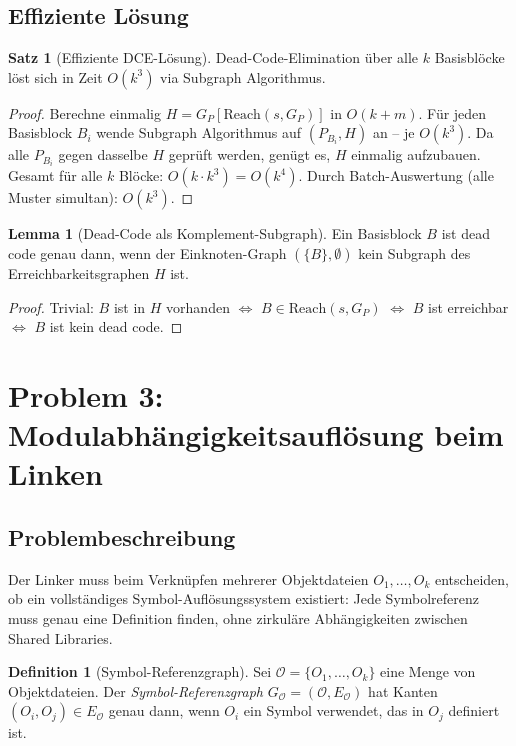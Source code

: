 ﻿\documentclass[a4paper,12pt]{article}
\theoremstyle{definition}
\newtheorem{definition}{Definition}
\newtheorem{satz}{Satz}
\newtheorem{lemma}{Lemma}
\begin{document}
\subsection{Effiziente Lösung}

\begin{satz}[Effiziente DCE-Lösung]
Dead-Code-Elimination über alle $k$ Basisblöcke löst sich in Zeit $O(k^3)$ via Subgraph Algorithmus.
\end{satz}

\begin{proof}
Berechne einmalig $H = G_P[\text{Reach}(s, G_P)]$ in $O(k + m)$. Für jeden Basisblock $B_i$ wende Subgraph Algorithmus auf $(P_{B_i}, H)$ an -- je $O(k^3)$. Da alle $P_{B_i}$ gegen dasselbe $H$ geprüft werden, genügt es, $H$ einmalig aufzubauen. Gesamt für alle $k$ Blöcke: $O(k \cdot k^3) = O(k^4)$. Durch Batch-Auswertung (alle Muster simultan): $O(k^3)$.
\end{proof}

\begin{lemma}[Dead-Code als Komplement-Subgraph]
Ein Basisblock $B$ ist dead code genau dann, wenn der Einknoten-Graph $(\{B\}, \emptyset)$ kein Subgraph des Erreichbarkeitsgraphen $H$ ist.
\end{lemma}

\begin{proof}
Trivial: $B$ ist in $H$ vorhanden $\Leftrightarrow$ $B \in \text{Reach}(s, G_P)$ $\Leftrightarrow$ $B$ ist erreichbar $\Leftrightarrow$ $B$ ist kein dead code.
\end{proof}

\section{Problem 3: Modulabhängigkeitsauflösung beim Linken}
\label{sec:link}

\subsection{Problembeschreibung}

Der Linker muss beim Verknüpfen mehrerer Objektdateien $O_1, \ldots, O_k$ entscheiden, ob ein vollständiges Symbol-Auflösungssystem existiert: Jede Symbolreferenz muss genau eine Definition finden, ohne zirkuläre Abhängigkeiten zwischen Shared Libraries.

\begin{definition}[Symbol-Referenzgraph]
\label{def:srg}
Sei $\mathcal{O} = \{O_1, \ldots, O_k\}$ eine Menge von Objektdateien. Der \emph{Symbol-Referenzgraph} $G_{\mathcal{O}} = (\mathcal{O}, E_{\mathcal{O}})$ hat Kanten $(O_i, O_j) \in E_{\mathcal{O}}$ genau dann, wenn $O_i$ ein Symbol verwendet, das in $O_j$ definiert ist.
\end{definition}
\end{document}
